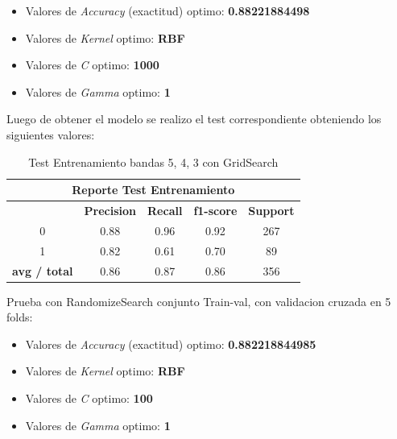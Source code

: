 \begin{itemize}
\item Valores de \textit{Accuracy} (exactitud) optimo: \textbf{0.88221884498}
\item Valores de \textit{Kernel} optimo: \textbf{RBF}
\item Valores de \textit{C} optimo: \textbf{1000}
\item Valores de \textit{Gamma} optimo: \textbf{1}

\end{itemize}

Luego de obtener el modelo se realizo el test correspondiente obteniendo los siguientes valores:
\begin{table}[H]
\begin{center}
\begin{tabular}{|c|c|c|c|c|}
\hline \multicolumn{5}{|c|}{Reporte Test Entrenamiento} \\ \hline
\hline \textbf{} & \textbf{Precision} & \textbf{Recall} & \textbf{f1-score} & \textbf{Support}\\ \hline 
				 0   & 0.88 & 0.96 & 0.92  & 267	\\ \hline 
				 1   & 0.82 & 0.61 & 0.70  & 89 \\ \hline 
\textbf{avg / total} & 0.86 & 0.87 & 0.86  & 356 \\ \hline
\end{tabular}
\end{center} \caption{Test Entrenamiento bandas 5, 4, 3 con GridSearch}\label{tab:gridsearchtest543}
\end{table}


Prueba con RandomizeSearch conjunto Train-val, con validacion cruzada en 5 folds:

\begin{itemize}
\item Valores de \textit{Accuracy} (exactitud) optimo: \textbf{0.882218844985}
\item Valores de \textit{Kernel} optimo: \textbf{RBF}
\item Valores de \textit{C} optimo: \textbf{100}
\item Valores de \textit{Gamma} optimo: \textbf{1}

\end{itemize}

